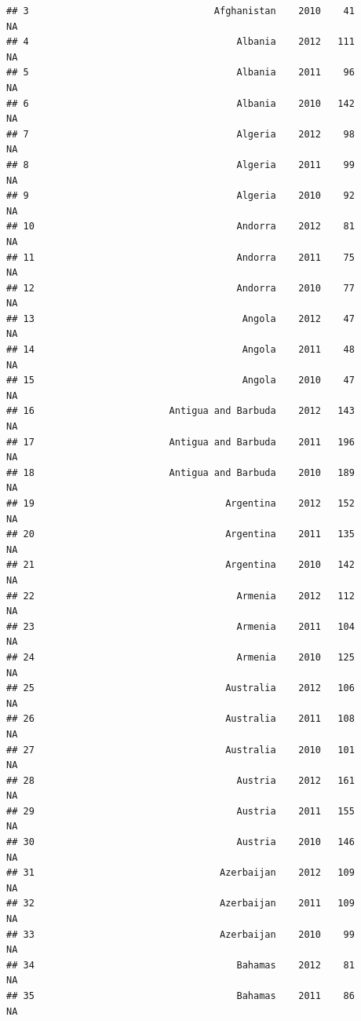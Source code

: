 \documentclass[
]{book}
\begin{document}
\begin{verbatim}
## 3                                 Afghanistan    2010    41              NA
## 4                                     Albania    2012   111              NA
## 5                                     Albania    2011    96              NA
## 6                                     Albania    2010   142              NA
## 7                                     Algeria    2012    98              NA
## 8                                     Algeria    2011    99              NA
## 9                                     Algeria    2010    92              NA
## 10                                    Andorra    2012    81              NA
## 11                                    Andorra    2011    75              NA
## 12                                    Andorra    2010    77              NA
## 13                                     Angola    2012    47              NA
## 14                                     Angola    2011    48              NA
## 15                                     Angola    2010    47              NA
## 16                        Antigua and Barbuda    2012   143              NA
## 17                        Antigua and Barbuda    2011   196              NA
## 18                        Antigua and Barbuda    2010   189              NA
## 19                                  Argentina    2012   152              NA
## 20                                  Argentina    2011   135              NA
## 21                                  Argentina    2010   142              NA
## 22                                    Armenia    2012   112              NA
## 23                                    Armenia    2011   104              NA
## 24                                    Armenia    2010   125              NA
## 25                                  Australia    2012   106              NA
## 26                                  Australia    2011   108              NA
## 27                                  Australia    2010   101              NA
## 28                                    Austria    2012   161              NA
## 29                                    Austria    2011   155              NA
## 30                                    Austria    2010   146              NA
## 31                                 Azerbaijan    2012   109              NA
## 32                                 Azerbaijan    2011   109              NA
## 33                                 Azerbaijan    2010    99              NA
## 34                                    Bahamas    2012    81              NA
## 35                                    Bahamas    2011    86              NA

\end{verbatim}
\end{document}
